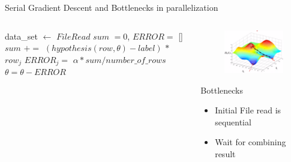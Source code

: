\documentclass{beamer}
\begin{document}
\begin{frame}{Serial Gradient Descent and Bottlenecks in parallelization}

\begin{columns}[T] %
	\begin{column}{.73\textwidth}
\begin{algorithm}[H]
	\begin{algorithmic}
		\STATE data\_set $\leftarrow$ $File Read$
		\STATE $sum$ $=0$, $ERROR =$ []
		\STATE $sum$ $+$$=$ $(hypothesis(row, \theta)- label)$ $*$ $row_{j}$  
		\ENDFOR
		\STATE $ERROR_{j}=$ $\alpha * sum / number\_of\_rows$
		\ENDFOR
		\STATE $\theta = \theta - ERROR$
		\ENDFOR
	\end{algorithmic}
	\caption{Pseudo-code for Gradient Decent}
\end{algorithm}		

	\end{column}%
	\hfill%

	\begin{column}{.27\textwidth}
	
	\begin{figure}
		\noindent
		\includegraphics*[width=1.3\textwidth]{images/gradient.png}

	\end{figure}
	Bottlenecks 
	\begin{itemize}
		\item Initial File read is sequential
		\item Wait for combining result
	\end{itemize}

	\end{column}%
	\hspace*{1cm}
\end{columns}


\end{frame}
\end{document}
